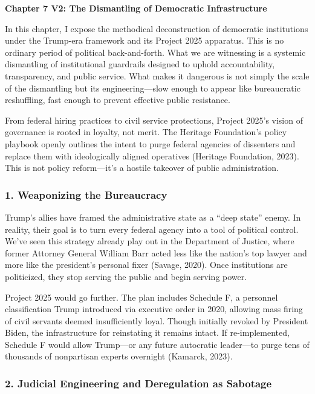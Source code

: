 \textbf{Chapter 7 V2: The Dismantling of Democratic Infrastructure}

In this chapter, I expose the methodical deconstruction of democratic
institutions under the Trump-era framework and its Project 2025
apparatus. This is no ordinary period of political back-and-forth. What
we are witnessing is a systemic dismantling of institutional guardrails
designed to uphold accountability, transparency, and public service.
What makes it dangerous is not simply the scale of the dismantling but
its engineering---slow enough to appear like bureaucratic reshuffling,
fast enough to prevent effective public resistance.

From federal hiring practices to civil service protections, Project
2025's vision of governance is rooted in loyalty, not merit. The
Heritage Foundation's policy playbook openly outlines the intent to
purge federal agencies of dissenters and replace them with ideologically
aligned operatives (Heritage Foundation, 2023). This is not policy
reform---it's a hostile takeover of public administration.

\subsubsection{\texorpdfstring{1. \textbf{Weaponizing the
Bureaucracy}}{1. Weaponizing the Bureaucracy}}\label{weaponizing-the-bureaucracy}

Trump's allies have framed the administrative state as a ``deep state''
enemy. In reality, their goal is to turn every federal agency into a
tool of political control. We've seen this strategy already play out in
the Department of Justice, where former Attorney General William Barr
acted less like the nation's top lawyer and more like the president's
personal fixer (Savage, 2020). Once institutions are politicized, they
stop serving the public and begin serving power.

Project 2025 would go further. The plan includes Schedule F, a personnel
classification Trump introduced via executive order in 2020, allowing
mass firing of civil servants deemed insufficiently loyal. Though
initially revoked by President Biden, the infrastructure for reinstating
it remains intact. If re-implemented, Schedule F would allow Trump---or
any future autocratic leader---to purge tens of thousands of nonpartisan
experts overnight (Kamarck, 2023).

\subsubsection{\texorpdfstring{2. \textbf{Judicial Engineering and
Deregulation as
Sabotage}}{2. Judicial Engineering and Deregulation as Sabotage}}\label{judicial-engineering-and-deregulation-as-sabotage}


